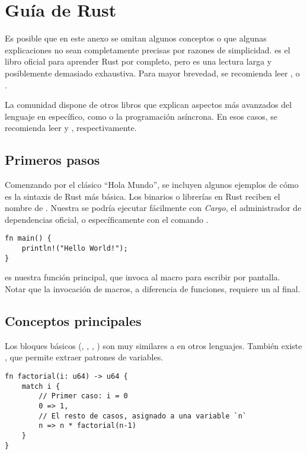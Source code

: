 \chapter{Guía de Rust}\label{annex:rust}

Es posible que en este anexo se omitan algunos conceptos o que algunas
explicaciones no sean completamente precisas por razones de simplicidad.
\textcite{rustbook} es el libro oficial para aprender Rust por completo, pero es
una lectura larga y posiblemente demasiado exhaustiva. Para mayor brevedad, se
recomienda leer \textcite{rustprofessionals}, \textcite{rustgentleintro} o
\textcite{rust30min}.

La comunidad dispone de otros libros que explican aspectos más avanzados del
lenguaje en específico, como \unsafe o la programación asíncrona. En esos casos,
se recomienda leer \textcite{nomicon} y \textcite{rustasyncbook},
respectivamente.

\section{Primeros pasos}

Comenzando por el clásico ``Hola Mundo'', se incluyen algunos ejemplos de cómo
es la sintaxis de Rust más básica. Los binarios o librerías en Rust reciben el
nombre de \crate. Nuestra \crate se podría ejecutar fácilmente con \emph{Cargo},
el administrador de dependencias oficial, o específicamente con el comando
.

\begin{verbatim}
fn main() {
    println!("Hello World!");
}
\end{verbatim}

 es nuestra función principal, que invoca al macro 
para escribir por pantalla. Notar que la invocación de macros, a diferencia de
funciones, requiere un \rust{!} al final.

\section{Conceptos principales}

Los bloques básicos (, , , ) son muy
similares a en otros lenguajes. También existe , que permite extraer
patrones de variables.

\begin{verbatim}
fn factorial(i: u64) -> u64 {
    match i {
        // Primer caso: i = 0
        0 => 1,
        // El resto de casos, asignado a una variable `n`
        n => n * factorial(n-1)
    }
}
\end{verbatim}

